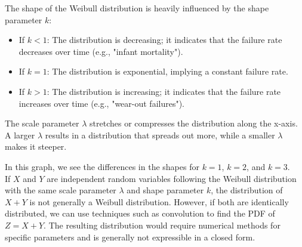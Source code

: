 The shape of the Weibull distribution is heavily influenced by the shape parameter $k$:

\begin{itemize}
    \item If $k < 1$: The distribution is decreasing; it indicates that the failure rate decreases over time (e.g., "infant mortality").
    \item If $k = 1$: The distribution is exponential, implying a constant failure rate.
    \item If $k > 1$: The distribution is increasing; it indicates that the failure rate increases over time (e.g., "wear-out failures").
\end{itemize}

The scale parameter $\lambda$ stretches or compresses the distribution along the x-axis. A larger $\lambda$ results in a distribution that spreads out more, while a smaller $\lambda$ makes it steeper.

\begin{center}
    \end{center}

    In this graph, we see the differences in the shapes for $k=1$, $k=2$, and $k=3$.\\

    If $X$ and $Y$ are independent random variables following the Weibull distribution with the same scale parameter $\lambda$ and shape parameter $k$, the distribution of $X + Y$ is not generally a Weibull distribution. However, if both are identically distributed, we can use techniques such as convolution to find the PDF of $Z = X + Y$. The resulting distribution would require numerical methods for specific parameters and is generally not expressible in a closed form.

